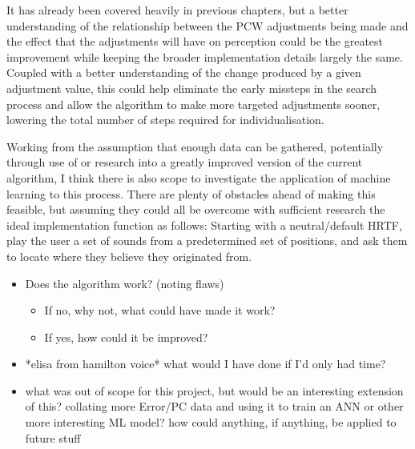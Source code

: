 It has already been covered heavily in previous chapters, but a better understanding of the relationship between the PCW adjustments being made and the effect that the adjustments will have on perception could be the greatest improvement while keeping the broader implementation details largely the same. Coupled with a better understanding of the change produced by a given adjustment value, this could help eliminate the early missteps in the search process and allow the algorithm to make more targeted adjustments sooner, lowering the total number of steps required for individualisation.

Working from the assumption that enough data can be gathered, potentially through use of or research into a greatly improved version of the current algorithm, I think there is also scope to investigate the application of machine learning to this process. There are plenty of obstacles ahead of making this feasible, but assuming they could all be overcome with sufficient research the ideal implementation function as follows: Starting with a neutral/default HRTF, play the user a set of sounds from a predetermined set of positions, and ask them to locate where they believe they originated from. 



\begin{itemize}

\item Does the algorithm work? (noting flaws)
\begin{itemize}
\item If no, why not, what could have made it work? 
\item If yes, how could it be improved? 
\end{itemize}

\item *elisa from hamilton voice* what would I have done if I'd only had time?
\item what was out of scope for this project, but would be an interesting extension of this? collating more Error/PC data and using it to train an ANN or other more interesting ML model? how could anything, if anything, be applied to future stuff
\end{itemize}